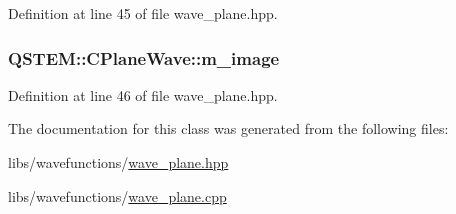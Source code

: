 Definition at line 45 of file wave\-\_\-plane.\-hpp.

\hypertarget{class_q_s_t_e_m_1_1_c_plane_wave_ac176c624744dc2e0e08478af67802e24}{
\subsubsection[{m\-\_\-image}]{ Q\-S\-T\-E\-M\-::\-C\-Plane\-Wave\-::m\-\_\-image\hspace{0.3cm}{\ttfamily [protected]}}}\label{class_q_s_t_e_m_1_1_c_plane_wave_ac176c624744dc2e0e08478af67802e24}


Definition at line 46 of file wave\-\_\-plane.\-hpp.



The documentation for this class was generated from the following files\-:\begin{DoxyCompactItemize}
\item 
libs/wavefunctions/\hyperlink{wave__plane_8hpp}{wave\-\_\-plane.\-hpp}\item 
libs/wavefunctions/\hyperlink{wave__plane_8cpp}{wave\-\_\-plane.\-cpp}\end{DoxyCompactItemize}
